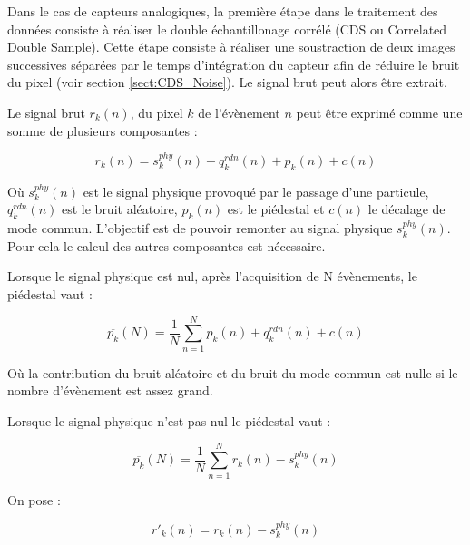    \medskip
   
   Dans le cas de capteurs analogiques, la premi\`ere \'etape dans le traitement des donn\'ees consiste à r\'ealiser le double \'echantillonage corr\'el\'e (CDS ou Correlated Double Sample). Cette \'etape consiste à r\'ealiser une soustraction de deux images successives s\'epar\'ees par le temps d'int\'egration du capteur afin de r\'eduire le bruit du pixel (voir section \ref{sect:CDS_Noise}). Le signal brut peut alors \^etre extrait.
   
   \medskip
   
   Le signal brut $r_k(n)$, du pixel $k$ de l'\'ev\`enement $n$ peut \^etre exprim\'e comme une somme de plusieurs composantes : 
   
   \begin{equation}
     r_k(n) = s_k^{phy}(n) + q_k^{rdn}(n) + p_k(n) + c(n)  
   \end{equation}
   
   O\`u $s_k^{phy}(n)$ est le signal physique provoqu\'e par le passage d'une particule, $q_k^{rdn}(n)$ est le bruit al\'eatoire, $p_k(n)$ est le pi\'edestal et $c(n)$ le d\'ecalage de mode commun. L'objectif est de pouvoir remonter au signal physique $s_k^{phy}(n)$. Pour cela le calcul des autres composantes est n\'ecessaire.
   
   \medskip
   
   Lorsque le signal physique est nul, apr\`es l'acquisition de N \'ev\`enements, le pi\'edestal vaut : 
   
   \begin{equation}
     \overline{p_k}(N) = \dfrac{1}{N} \sum_{n=1}^N p_k(n) + q_k^{rdn}(n) + c(n)    
   \end{equation}
   
   O\`u la contribution du bruit al\'eatoire et du bruit du mode commun est nulle si le nombre d'\'ev\`enement est assez grand.
   
   \medskip
   
   Lorsque le signal physique n'est pas nul le pi\'edestal vaut : 
   
   \begin{equation}
     \overline{p_k}(N) = \dfrac{1}{N} \sum_{n=1}^N r_k(n) - s_k^{phy}(n)
     \label{eq:piedestal}
   \end{equation}
   
   On pose : 
   
   \begin{equation}
    r'_k(n) = r_k(n) - s_k^{phy}(n)
   \end{equation}
   
